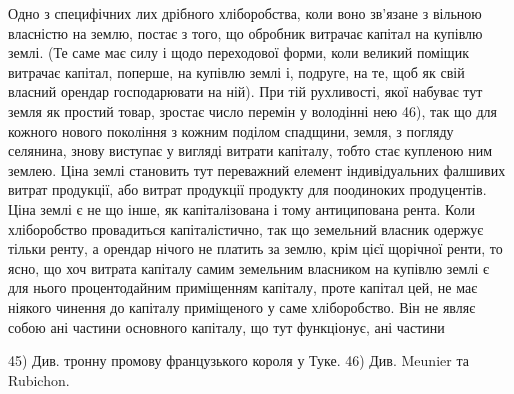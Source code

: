 Одно з специфічних лих дрібного хліборобства, коли воно зв’язане з вільною
власністю на землю, постає з того, що обробник витрачає капітал на купівлю
землі. (Те саме має силу і щодо переходової форми, коли великий поміщик
витрачає капітал, поперше, на купівлю землі і, подруге, на те, щоб як
свій власний орендар господарювати на ній). При тій рухливості, якої набуває
тут земля як простий товар, зростає число перемін у володінні нею 46), так що
для кожного нового покоління з кожним поділом спадщини, земля, з погляду
селянина, знову виступає у вигляді витрати капіталу, тобто стає купленою
ним землею. Ціна землі становить тут переважний елемент індивідуальних фалшивих
витрат продукції, або витрат продукції продукту для поодиноких продуцентів.
Ціна землі є не що інше, як капіталізована і тому антиципована рента.
Коли хліборобство провадиться капіталістично, так що земельний власник одержує
тільки ренту, а орендар нічого не платить за землю, крім цієї щорічної
ренти, то ясно, що хоч витрата капіталу самим земельним власником на купівлю
землі є для нього процентодайним приміщенням капіталу, проте капітал
цей, не має ніякого чинення до капіталу приміщеного у саме хліборобство. Він
не являє собою ані частини основного капіталу, що тут функціонує, ані частини

45) Див. тронну промову французького короля у Туке.
46) Див. Meunier та Rubichon.
